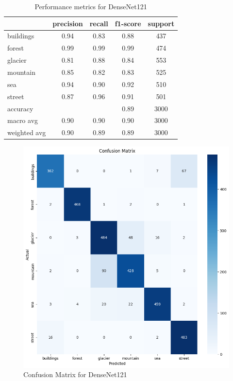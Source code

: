 \documentclass[conference]{IEEEtran}
\begin{document}
\begin{table}[H]
\centering
\begin{tabular}{lcccc}
\toprule
\textbf{} & \textbf{precision} & \textbf{recall} & \textbf{f1-score} & \textbf{support} \\
\midrule
buildings & 0.94 & 0.83 & 0.88 & 437 \\
forest & 0.99 & 0.99 & 0.99 & 474 \\
glacier & 0.81 & 0.88 & 0.84 & 553 \\
mountain & 0.85 & 0.82 & 0.83 & 525 \\
sea & 0.94 & 0.90 & 0.92 & 510 \\
street & 0.87 & 0.96 & 0.91 & 501 \\
\midrule
accuracy & & & 0.89 & 3000 \\
macro avg & 0.90 & 0.90 & 0.90 & 3000 \\
weighted avg & 0.90 & 0.89 & 0.89 & 3000 \\
\bottomrule
\end{tabular}
\caption{Performance metrics for DenseNet121}
\end{table}

\begin{figure}[H]
    \centering
    \includegraphics[width=1\linewidth]{images//DenseNet/ConfusionMatrixDenseNet.png}
    \caption{Confusion Matrix for DenseNet121}
    \label{fig:CM_DenseNet}
\end{figure}
\end{document}
